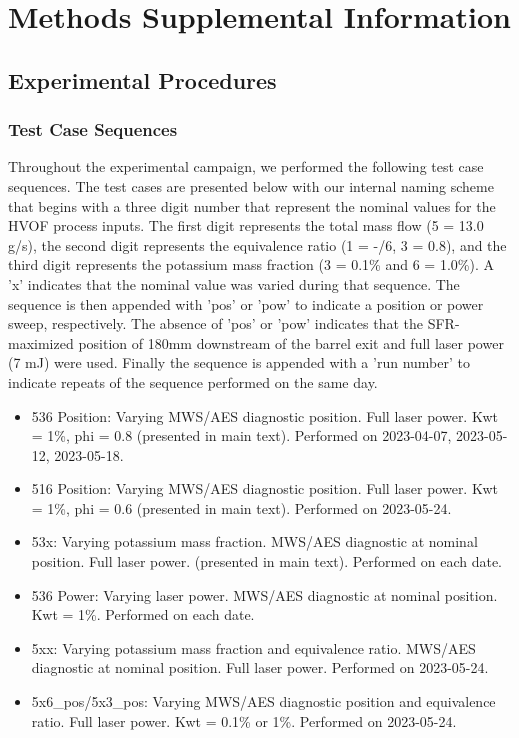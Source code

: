 \section{Methods Supplemental Information}


\subsection{Experimental Procedures}

\subsubsection{Test Case Sequences}


Throughout the experimental campaign, we performed the following test case sequences. The test cases are presented below with our internal naming scheme that begins with a three digit number that represent the nominal values for the HVOF process inputs. The first digit represents the total mass flow (5 = 13.0 g/s), the second digit represents the equivalence ratio (1 = -/6, 3 = 0.8), and the third digit represents the potassium mass fraction (3 = 0.1\% and 6 = 1.0\%). A 'x' indicates that the nominal value was varied during that sequence. The sequence is then appended with 'pos' or 'pow' to indicate a position or power sweep, respectively. The absence of 'pos' or 'pow' indicates that the SFR-maximized position of 180mm downstream of the barrel exit and full laser power (7 mJ) were used. Finally the sequence is appended with a 'run number' to indicate repeats of the sequence performed on the same day. 


\begin{itemize}
    \item 536 Position: Varying MWS/AES diagnostic position. Full laser power. Kwt = 1\%, phi = 0.8 (presented in main text). Performed on 2023-04-07, 2023-05-12, 2023-05-18.
    \item 516 Position: Varying MWS/AES diagnostic position. Full laser power. Kwt = 1\%, phi = 0.6 (presented in main text). Performed on 2023-05-24.
    \item 53x: Varying potassium mass fraction. MWS/AES diagnostic at nominal position. Full laser power. (presented in main text). Performed on each date. 
    \item 536 Power: Varying laser power. MWS/AES diagnostic at nominal position. Kwt = 1\%. Performed on each date. 
    \item 5xx: Varying potassium mass fraction and equivalence ratio. MWS/AES diagnostic at nominal position. Full laser power. Performed on 2023-05-24.
    \item 5x6\_pos/5x3\_pos: Varying MWS/AES diagnostic position and equivalence ratio. Full laser power. Kwt = 0.1\% or 1\%. Performed on 2023-05-24.
\end{itemize}

